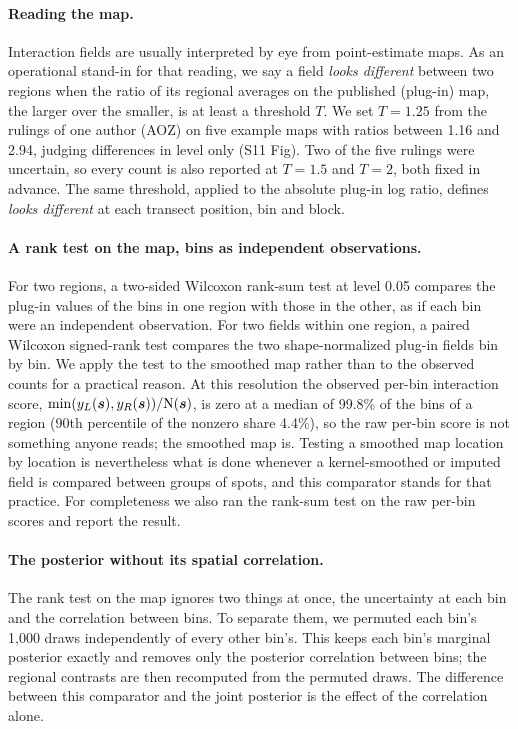 \documentclass[10pt,letterpaper]{article}
\begin{document}
\paragraph*{Reading the map.} Interaction fields are usually interpreted by eye from point-estimate maps. As an operational stand-in for that reading, we say a field \textit{looks different} between two regions when the ratio of its regional averages on the published (plug-in) map, the larger over the smaller, is at least a threshold $T$. We set $T = 1.25$ from the rulings of one author (AOZ) on five example maps with ratios between 1.16 and 2.94, judging differences in level only (S11 Fig). Two of the five rulings were uncertain, so every count is also reported at $T = 1.5$ and $T = 2$, both fixed in advance. The same threshold, applied to the absolute plug-in log ratio, defines \textit{looks different} at each transect position, bin and block.

\paragraph*{A rank test on the map, bins as independent observations.} For two regions, a two-sided Wilcoxon rank-sum test at level 0.05 compares the plug-in values of the bins in one region with those in the other, as if each bin were an independent observation. For two fields within one region, a paired Wilcoxon signed-rank test compares the two shape-normalized plug-in fields bin by bin. We apply the test to the smoothed map rather than to the observed counts for a practical reason. At this resolution the observed per-bin interaction score, $\min(y_L(\mbox{\boldmath $s$}), y_R(\mbox{\boldmath $s$})) / \mbox{N}(\mbox{\boldmath $s$})$, is zero at a median of 99.8\% of the bins of a region (90th percentile of the nonzero share 4.4\%), so the raw per-bin score is not something anyone reads; the smoothed map is. Testing a smoothed map location by location is nevertheless what is done whenever a kernel-smoothed or imputed field is compared between groups of spots, and this comparator stands for that practice. For completeness we also ran the rank-sum test on the raw per-bin scores and report the result.

\paragraph*{The posterior without its spatial correlation.} The rank test on the map ignores two things at once, the uncertainty at each bin and the correlation between bins. To separate them, we permuted each bin's 1,000 draws independently of every other bin's. This keeps each bin's marginal posterior exactly and removes only the posterior correlation between bins; the regional contrasts are then recomputed from the permuted draws. The difference between this comparator and the joint posterior is the effect of the correlation alone.
\end{document}
